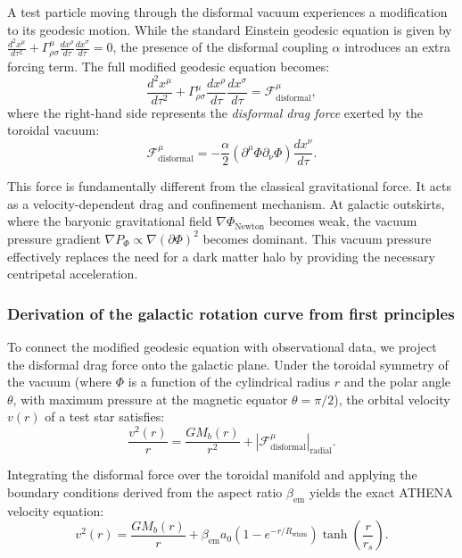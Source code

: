 \documentclass[11pt,a4paper]{article}
\begin{document}
A test particle moving through the disformal vacuum experiences a modification to its geodesic motion. While the standard Einstein geodesic equation is given by \( \frac{d^2 x^\mu}{d\tau^2} + \Gamma^\mu_{\rho\sigma} \frac{dx^\rho}{d\tau} \frac{dx^\sigma}{d\tau} = 0 \), the presence of the disformal coupling \(\alpha\) introduces an extra forcing term. The full modified geodesic equation becomes:
\[
\frac{d^2 x^\mu}{d\tau^2} + \Gamma^\mu_{\rho\sigma} \frac{dx^\rho}{d\tau} \frac{dx^\sigma}{d\tau} 
= \mathcal{F}^\mu_{\mathrm{disformal}},
\]
where the right-hand side represents the \textit{disformal drag force} exerted by the toroidal vacuum:
\[
\mathcal{F}^\mu_{\mathrm{disformal}} = -\frac{\alpha}{2} \left( \partial^\mu \Phi \partial_\nu \Phi \right) \frac{dx^\nu}{d\tau}.
\]

This force is fundamentally different from the classical gravitational force. It acts as a velocity-dependent drag and confinement mechanism. At galactic outskirts, where the baryonic gravitational field \( \nabla \Phi_{\mathrm{Newton}} \) becomes weak, the vacuum pressure gradient \( \nabla P_\Phi \propto \nabla (\partial \Phi)^2 \) becomes dominant. This vacuum pressure effectively replaces the need for a dark matter halo by providing the necessary centripetal acceleration.

\subsubsection{Derivation of the galactic rotation curve from first principles}
\label{subsec:rotation_derivation}
To connect the modified geodesic equation with observational data, we project the disformal drag force onto the galactic plane. Under the toroidal symmetry of the vacuum (where \(\Phi\) is a function of the cylindrical radius \(r\) and the polar angle \(\theta\), with maximum pressure at the magnetic equator \(\theta = \pi/2\)), the orbital velocity \(v(r)\) of a test star satisfies:
\[
\frac{v^2(r)}{r} = \frac{G M_b(r)}{r^2} + \left| \mathcal{F}^\mu_{\mathrm{disformal}} \right|_{\text{radial}}.
\]

Integrating the disformal force over the toroidal manifold and applying the boundary conditions derived from the aspect ratio \(\beta_{\mathrm{em}}\) yields the exact ATHENA velocity equation:
\[
\boxed{ v^2(r) = \frac{G M_b(r)}{r} + \beta_{\mathrm{em}} a_0 \left(1 - e^{-r/R_{\mathrm{whim}}}\right) \tanh\left(\frac{r}{r_s}\right) }.
\]
\end{document}
